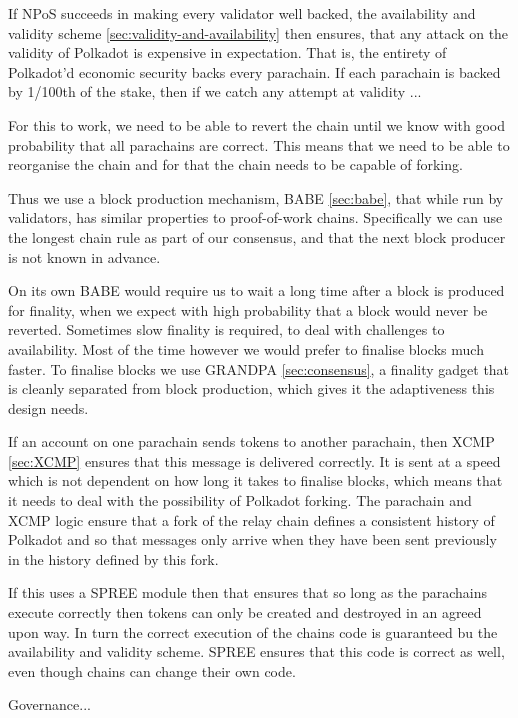 If NPoS succeeds in making every validator well backed, the availability and validity scheme \ref{sec:validity-and-availability} then ensures, that any attack on the validity of Polkadot is expensive in expectation. That is, the entirety of Polkadot'd economic security backs every parachain. If each parachain is backed by 1/100th of the stake, then if we catch any attempt at validity ...

For this to work, we need to be able to revert the chain until we know with good probability that all parachains are correct. This means that we need to be able to reorganise the chain and for that the chain needs to be capable of forking.

Thus we use a block production mechanism, BABE \ref{sec:babe}, that while run by validators, has similar properties to proof-of-work chains. Specifically we can use the longest chain rule as part of our consensus, and that the next block producer is not known in advance.

On its own BABE would require us to wait a long time after a block is produced for finality, when we expect with high probability that a block would never be reverted. Sometimes slow finality is required, to deal with challenges to availability. Most of the time however we would prefer to finalise blocks much faster.  To finalise blocks we use GRANDPA \ref{sec:consensus}, a finality gadget that is cleanly separated from block production, which gives it the adaptiveness this design needs. 

If an account on one parachain sends tokens to another parachain, then XCMP \ref{sec:XCMP} ensures that this message is delivered correctly. It is sent at a speed which is not dependent on how long it takes to finalise blocks, which means that it needs to deal with the possibility of Polkadot forking. The parachain and XCMP logic ensure that a fork of the relay chain defines a consistent history of Polkadot and so that messages only arrive when they have been sent previously in the history defined by this fork.

If this uses a SPREE module then that ensures that so long as the parachains execute correctly then tokens can only be created and destroyed in an agreed upon way. In turn the correct execution of the chains code is guaranteed bu the availability and validity scheme. SPREE ensures that this code is correct as well, even though chains can change their own code.

Governance...

